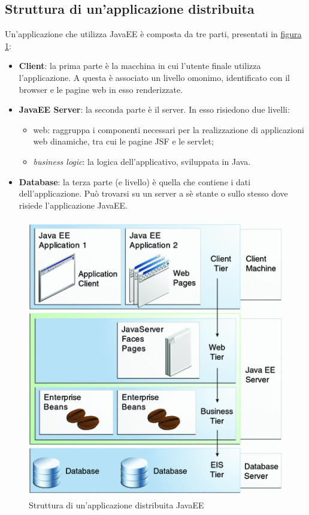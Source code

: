 \subsection{Struttura di un'applicazione distribuita}
Un'applicazione che utilizza JavaEE è composta da tre parti, presentati in \hyperref[fig:javaee-livelli]{figura \ref{fig:javaee-livelli}}\autocite{bib:javaee-tutorial}:
\begin{itemize}
	\item \textbf{Client}: la prima parte è la macchina in cui l'utente finale utilizza l'applicazione. A questa è associato un livello omonimo, identificato con il browser e le pagine web in esso renderizzate.
	\item \textbf{JavaEE Server}: la seconda parte è il server. In esso risiedono due livelli:
	\begin{itemize}
		\item web: raggruppa i componenti necessari per la realizzazione di applicazioni web dinamiche, tra cui le pagine JSF e le servlet;
		\item \textit{business logic}: la logica dell'applicativo, sviluppata in Java.
	\end{itemize}
	\item \textbf{Database}: la terza parte (e livello) è quella che contiene i dati dell'applicazione. Può trovarsi su un server a sè stante o sullo stesso dove risiede l'applicazione JavaEE.
\end{itemize}
\begin{figure}
	\centering
	\includegraphics{Immagini/javaee-struttura.png}
	\caption{Struttura di un'applicazione distribuita JavaEE}
	\label{fig:javaee-livelli}
\end{figure}

